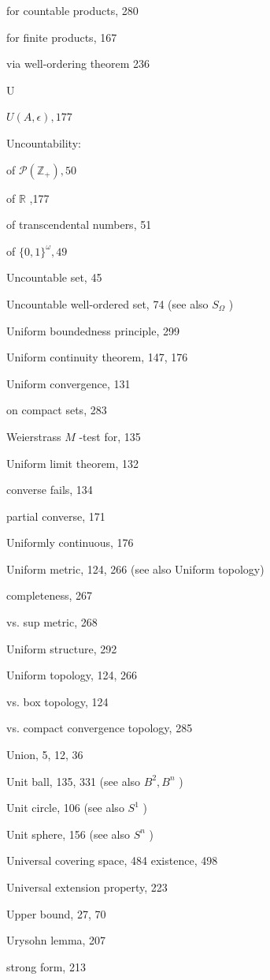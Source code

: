 for countable products, 280

for finite products, 167

via well-ordering theorem 236

U

\(U\left( {A,\epsilon }\right) ,{177}\)

Uncountability:

of \(\mathcal{P}\left( {\mathbb{Z}}_{ + }\right) ,{50}\)

of \(\mathbb{R}\) ,177

of transcendental numbers, 51

of \(\{ 0,1{\} }^{\omega },{49}\)

Uncountable set, 45

Uncountable well-ordered set, 74 (see also \({S}_{\Omega }\) )

Uniform boundedness principle, 299

Uniform continuity theorem, 147, 176

Uniform convergence, 131

on compact sets, 283

Weierstrass \(M\) -test for, 135

Uniform limit theorem, 132

converse fails, 134

partial converse, 171

Uniformly continuous, 176

Uniform metric, 124, 266 (see also Uniform topology)

completeness, 267

vs. sup metric, 268

Uniform structure, 292

Uniform topology, 124, 266

vs. box topology, 124

vs. compact convergence topology, 285

Union, 5, 12, 36

Unit ball, 135, 331 (see also \({B}^{2},{B}^{n}\) )

Unit circle, 106 (see also \({S}^{1}\) )

Unit sphere, 156 (see also \({S}^{n}\) )

Universal covering space, 484 existence, 498

Universal extension property, 223

Upper bound, 27, 70

Urysohn lemma, 207

strong form, 213

